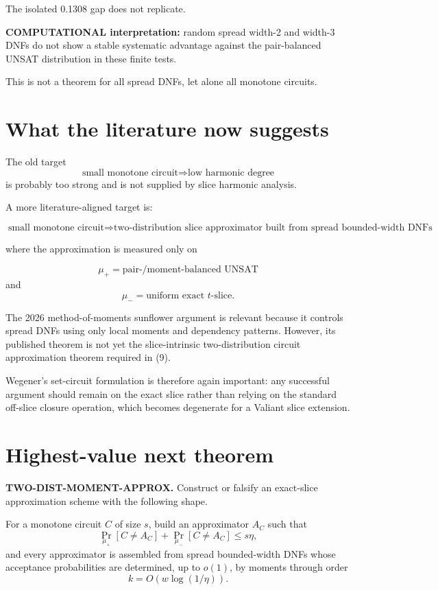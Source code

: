 \documentclass[11pt]{article}
\begin{document}
The isolated 0.1308 gap does not replicate.

\textbf{COMPUTATIONAL interpretation:} random spread width-2 and width-3 DNFs
do not show a stable systematic advantage against the pair-balanced UNSAT
distribution in these finite tests.

This is not a theorem for all spread DNFs, let alone all monotone circuits.

\section{What the literature now suggests}

The old target
\[
\text{small monotone circuit}
\Longrightarrow
\text{low harmonic degree}
\]
is probably too strong and is not supplied by slice harmonic analysis.

A more literature-aligned target is:

\[
\boxed{
\text{small monotone circuit}
\Longrightarrow
\text{two-distribution slice approximator built from spread bounded-width DNFs}
}
\tag{9}
\]

where the approximation is measured only on

\[
\mu_+ = \text{pair-/moment-balanced UNSAT}
\]
and
\[
\mu_- = \text{uniform exact }t\text{-slice}.
\]

The 2026 method-of-moments sunflower argument is relevant because it controls
spread DNFs using only local moments and dependency patterns.  However, its
published theorem is not yet the slice-intrinsic two-distribution circuit
approximation theorem required in (9).

Wegener's set-circuit formulation is therefore again important: any successful
argument should remain on the exact slice rather than relying on the standard
off-slice closure operation, which becomes degenerate for a Valiant slice
extension.

\section{Highest-value next theorem}

\textbf{TWO-DIST-MOMENT-APPROX.}  Construct or falsify an exact-slice
approximation scheme with the following shape.

For a monotone circuit \(C\) of size \(s\), build an approximator \(A_C\)
such that
\[
\Pr_{\mu_+}[C\ne A_C]
+
\Pr_{\mu_-}[C\ne A_C]
\le s\eta,
\tag{10}
\]
and every approximator is assembled from spread bounded-width DNFs whose
acceptance probabilities are determined, up to \(o(1)\), by moments through
order
\[
k=O(w\log(1/\eta)).
\tag{11}
\]
\end{document}
